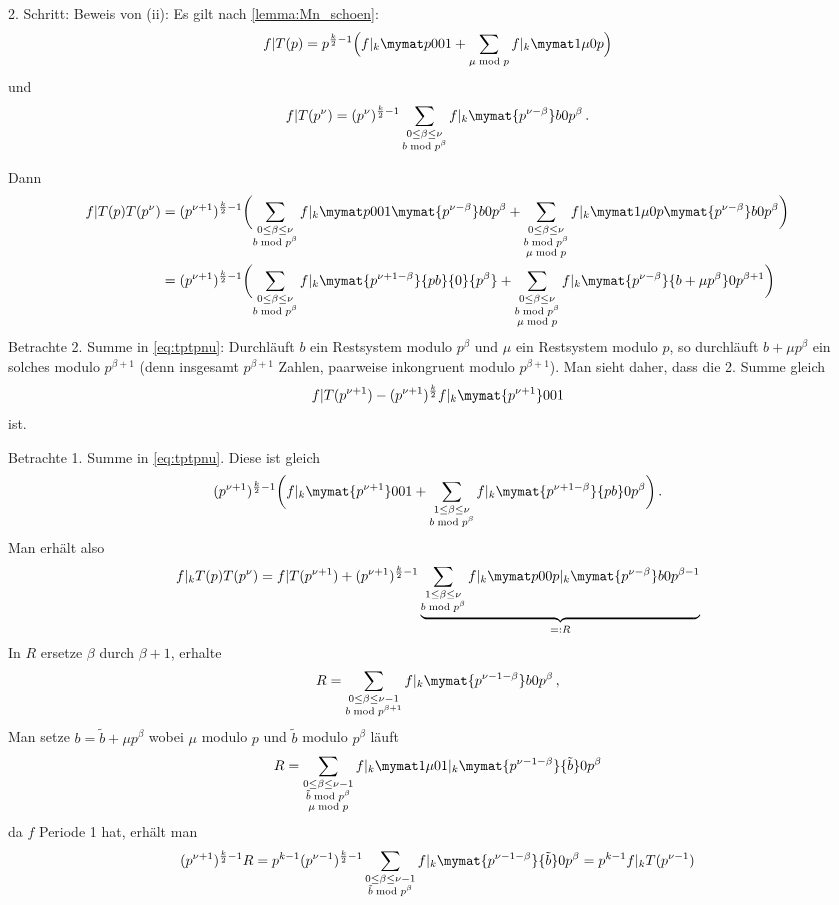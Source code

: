 \begin{bewe}
	
	2. Schritt: Beweis von (ii):
	Es gilt nach \autoref{lemma:Mn_schoen}:
	\[
		f|T(p) = p^{\frac{k}{2}-1} \Bigl(f|_k \mymat p001 + \sum_{\mu \bmod p} f|_k \mymat 1\mu0p \Bigr)
	\]
	und
	\[
		f|T(p^\nu) = (p^\nu)^{\frac{k}{2}-1} \sum_{\substack{0 \leq \beta \leq \nu \\ b \bmod p^\beta}} f|_k \mymat{p^{\nu-\beta}}b0{p^\beta}
		\,.
	\]
	
	Dann
	\begin{align}\label{eq:tptpnu}
		f|T(p)T(p^\nu)
		&= (p^{\nu+1})^{\frac{k}{2}-1} \biggl( \sum_{\substack{0 \leq \beta \leq \nu \\ b \bmod p^\beta}} f|_k \mymat p001 \mymat {p^{\nu-\beta}}b0{p^\beta} + \sum_{\substack{0 \leq \beta \leq \nu \\ b \bmod p^\beta \\ \mu\bmod p}} f|_k \mymat 1\mu0p \mymat {p^{\nu-\beta}}b0{p^\beta} \biggr) \nonumber \\
		&= (p^{\nu+1})^{\frac{k}{2}-1} \biggl( \sum_{\substack{0 \leq \beta \leq \nu\\b \bmod p^\beta}} f|_k \mymat {p^{\nu +1-\beta}}{pb}{0}{p^\beta} + \sum_{\substack{0 \leq \beta \leq \nu \\ b \bmod p^\beta \\ \mu \bmod p}} f|_k \mymat{p^{\nu-\beta}}{b+\mu p^\beta}0{p^{\beta+1}} \biggr)
	\end{align}
	Betrachte 2. Summe in \eqref{eq:tptpnu}:
	Durchläuft $b$ ein Restsystem modulo $p^\beta$ und $\mu$ ein Restsystem modulo $p$, so durchläuft $b+\mu p^\beta$ ein solches modulo $p^{\beta+1}$ (denn insgesamt $p^{\beta+1}$ Zahlen, paarweise inkongruent modulo $p^{\beta+1}$).
	Man sieht daher, dass die 2. Summe gleich
	\[
		f|T(p^{\nu+1}) - (p^{\nu+1})^{\frac{k}{2}} f|_k \mymat {p^{\nu+1}}001
	\]
	ist.
	
	Betrachte 1. Summe in \eqref{eq:tptpnu}. Diese ist gleich
	\[
		(p^{\nu + 1})^{\frac{k}{2}-1} \biggl(f|_k \mymat{p^{\nu+1}}001 + \sum_{\substack{1 \leq \beta \leq \nu \\ b \bmod p^\beta}} f|_k \mymat{p^{\nu+1-\beta}}{pb}0{p^\beta} \biggr)
		\,.
	\]
	Man erhält also
	\[
		f|_k T(p)T(p^\nu)
		= f|T(p^{\nu+1}) + (p^{\nu+1})^{\frac{k}{2}-1} \underbrace{\sum_{\substack{1 \leq \beta \leq \nu\\ b \bmod p^\beta}} f|_k \mymat p00p |_k \mymat {p^{\nu-\beta}}b0{p^{\beta-1}}
		}_{=: R}
	\]
	In $R$ ersetze $\beta$ durch $\beta + 1$, erhalte
	\[
		R = \sum_{\substack{0 \leq \beta \leq \nu-1\\ b \bmod p^{\beta+1} }} f|_k \mymat {p^{\nu-1-\beta}}b0{p^{\beta}}
		\,,
	\]
	Man setze $b = \tilde b + \mu p^\beta$ wobei $\mu$ modulo $p$ und $\tilde b$ modulo $p^\beta$ läuft
	\[
		R = \sum_{\substack{ 0 \leq \beta \leq \nu-1\\ \tilde b \bmod p^\beta \\ \mu \bmod p}} f|_k \mymat 1\mu01 |_k \mymat {p^{\nu-1-\beta}}{\tilde b}0{p^\beta}
	\]
	da $f$ Periode 1 hat, erhält man
	\[
		(p^{\nu+1})^{\frac{k}{2}-1}R
	 	= p^{k-1}(p^{\nu-1})^{\frac{k}{2}-1} \sum_{\substack{0 \leq \beta \leq \nu-1 \\ \tilde b \bmod p^\beta}} f|_k \mymat {p^{\nu-1-\beta}}{\tilde b}0{p^\beta}
	 	= p^{k-1} f|_kT(p^{\nu-1})
	\]
\end{bewe}
